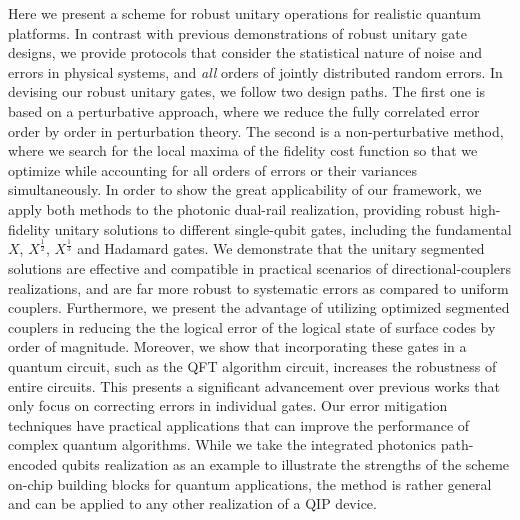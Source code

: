 \documentclass[floatfix,reprint, amsmath,amssymb,aps,superscriptaddress,nofootinbib]{revtex4-2}
\begin{document}
Here we present a scheme for robust unitary operations for realistic quantum platforms. In contrast with previous demonstrations of robust unitary gate designs, we provide protocols that consider the statistical nature of noise and errors in physical systems, and \emph{all} orders of jointly distributed random errors. In devising our robust unitary gates, we follow two design paths. The first one is based on a perturbative approach, where we reduce the fully correlated error order by order in perturbation theory. The second is a non-perturbative method, where we search for the local maxima of the fidelity cost function so that we optimize while accounting for all orders of errors or their variances simultaneously. In order to show the great applicability of our framework, we apply both methods to the photonic dual-rail realization, providing robust high-fidelity unitary solutions to different single-qubit gates, including the fundamental $X$, ${X}^{\frac{1}{2}}$, ${X}^{\frac{1}{3}}$ and Hadamard gates. We demonstrate that the unitary segmented solutions are effective and compatible in practical scenarios of directional-couplers realizations, and are far more robust to systematic errors as compared to uniform couplers. 
Furthermore, we present the advantage of utilizing optimized segmented couplers in reducing the the logical error of the logical state of surface codes by order of  magnitude. Moreover, we show that incorporating these gates in a quantum circuit, such as the QFT algorithm circuit, increases the robustness of entire circuits. This presents a significant advancement over previous works that only focus on correcting errors in individual gates. Our error mitigation techniques have practical applications that can improve the performance of complex quantum algorithms. While we take the integrated photonics path-encoded qubits realization as an example to illustrate the strengths of the scheme on-chip building blocks for quantum applications, the method is rather general and can be applied to any other realization of a QIP device.
\end{document}

